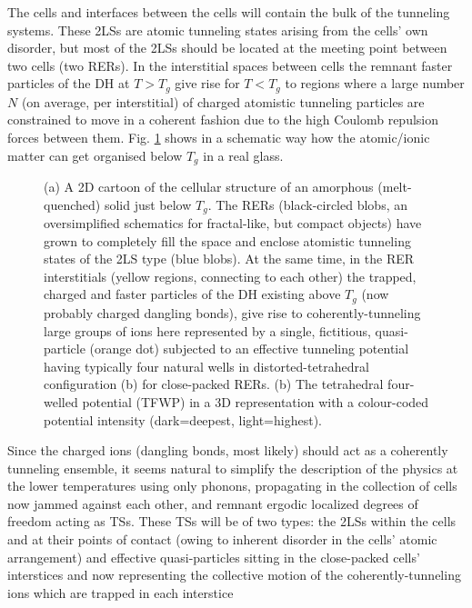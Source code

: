 \documentclass[10pt]{article}
\begin{document}
The cells and interfaces between the cells will contain the bulk of the tunneling 
systems. These 2LSs are atomic tunneling states arising from the cells' own disorder, 
but most of the 2LSs should be located at the meeting point between two cells (two 
RERs). In the interstitial spaces between cells the remnant faster particles 
of the DH at $T>T_g$ give rise for $T<T_g$ to regions where a large number $N$ 
(on average, per interstitial) of charged atomistic tunneling particles are constrained 
to move in a coherent fashion due to the high Coulomb repulsion forces between 
them. Fig. \ref{cellstructure} shows in a
schematic way how the atomic/ionic matter can get organised below $T_g$ in a
real glass. 
\begin{figure}[h]
\centering
\vskip -3mm
\caption[2]{ (a) A 2D cartoon of the cellular structure of an amorphous 
(melt-quenched) solid just below $T_g$. The RERs (black-circled blobs, an 
oversimplified schematics for fractal-like, but compact objects) have grown 
to completely fill the space and enclose atomistic tunneling states of the 
2LS type (blue blobs). At the same time, in the RER interstitials (yellow 
regions, connecting to each other) the trapped, charged and faster particles 
of the DH existing above $T_g$ (now probably charged dangling bonds), 
give rise to coherently-tunneling large groups of ions here represented by a 
single, fictitious, quasi-particle (orange dot) subjected to an effective 
tunneling potential having typically four natural wells in distorted-tetrahedral 
configuration (b) for close-packed RERs. (b) The tetrahedral four-welled
potential (TFWP) in a 3D representation with a colour-coded potential intensity
(dark=deepest, light=highest). }
\label{cellstructure}
\end{figure}     
Since the charged ions (dangling bonds, most likely) should act as a 
coherently tunneling ensemble, it seems natural to simplify the description of the 
physics at the lower temperatures using only phonons, propagating in the 
collection of cells now jammed against each other, and remnant ergodic 
localized degrees of freedom acting as TSs. These TSs will be of two types: the 
2LSs within the cells and at their points of contact (owing to inherent disorder in 
the cells' atomic arrangement) and effective quasi-particles sitting in the 
close-packed cells' interstices and now representing the collective motion of the 
coherently-tunneling ions which are trapped in each interstice 
\end{document}
